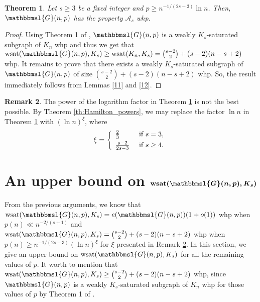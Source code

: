 \documentclass[hidelinks, 11pt]{article}
\theoremstyle{plain}
\newtheorem{theorem}{Theorem}[section]
\theoremstyle{definition}
\newtheorem{remark}[theorem]{Remark}
\newcommand{\bmi}[1]{\mbox{\boldmath $ #1$}}
\begin{document}
\begin{theorem}\label{th_upper}
Let  $s\geq 3$ be  a fixed  integer and $p\geq n^{-1/(2s-3)}\ln n$. Then,  $\mathbbmsl{G}(n,p)$ has the property $\mathcal{A}_s$ whp.
\end{theorem}




\begin{proof}
Using    Theorem 1 of  \cite{bal},    $\mathbbmsl{G}(n,p)$ is a weakly $K_s$-saturated subgraph of  $K_n$ whp and thus    we get  that $\mathrm{wsat}(\mathbbmsl{G}(n, p), K_s)\geq\mathrm{wsat}(K_n, K_s)={s-2 \choose 2}+(s-2)(n-s+2)$  whp.
It remains to prove that  there exists a weakly $K_s$-saturated subgraph of $\mathbbmsl{G}(n,p)$ of size   ${s-2\choose 2}+(s-2)(n-s+2)$    whp. So,
the result immediately  follows  from Lemmas \ref{11} and \ref{12}.
\end{proof}




\begin{remark}\label{rmrk}
The power of  the logarithm  factor in Theorem \ref{th_upper} is not the best possible.  By Theorem \ref{th:Hamilton_powers}, we may replace the factor $\ln n$ in Theorem \ref{th_upper} with $(\ln n)^{\xi}$, where
$$\xi=\left\{\begin{array}{ll}
\frac{2}{3}  &   \mbox{ if } s=3\mbox{,}\\\vspace{-3mm}\\
\frac{s-2}{2s-3} &  \mbox{ if } s\geq 4\mbox{.}
\end{array}\right.$$
\end{remark}



\section{An  upper bound on $\bmi{\mathrm{wsat}(\mathbbmsl{G}(n, p), K_s)}$}\label{secUpperwsat}



From the previous arguments, we know that  $\mathrm{wsat}(\mathbbmsl{G}(n, p), K_s)=e(\mathbbmsl{G}(n,p))(1+o(1))$ whp when $p(n)\ll n^{-2/(s+1)}$ and $\mathrm{wsat}(\mathbbmsl{G}(n, p), K_s)={s-2\choose 2}+(s-2)(n-s+2)$  whp when $p(n)\geq n^{-1/(2s-3)}(\ln n)^{\xi}$ for    $\xi$   presented  in Remark \ref{rmrk}. In this section, we give  an upper bound on  $\mathrm{wsat}(\mathbbmsl{G}(n, p), K_s)$ for all the remaining values of $p$. It worth to mention  that $\mathrm{wsat}(\mathbbmsl{G}(n, p), K_s)\geq{s-2\choose 2}+(s-2)(n-s+2)$ whp,  since $\mathbbmsl{G}(n,p)$ is a  weakly $K_s$-saturated subgraph of  $K_n$  whp  for those values of $p$ by Theorem 1 of \cite{bal}.
\end{document}
